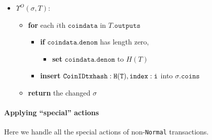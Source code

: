 \documentclass[
]{article}
\newcommand{\passthrough}[1]{#1}
\providecommand{\tightlist}{%
  \setlength{\itemsep}{0pt}\setlength{\parskip}{0pt}}
\begin{document}
\begin{itemize}
  \tightlist
  \item
        \(\Upsilon^O(\sigma, T)\):

        \begin{itemize}
          \tightlist
          \item
                \textbf{for} each \(i\)th \(\mathtt{coindata}\) in
                \(T.\mathtt{outputs}\)

                \begin{itemize}
                  \tightlist
                  \item
                        \textbf{if} \(\mathtt{coindata.denom}\) has length zero,

                        \begin{itemize}
                          \tightlist
                          \item
                                \textbf{set} \(\mathtt{coindata.denom}\) to \(H(T)\)
                        \end{itemize}
                  \item
                        \textbf{insert} \(\mathtt{CoinID\\{txhash: H(T), index: i \\}}\)
                        into \(\sigma.\mathtt{coins}\)
                \end{itemize}
          \item
                \textbf{return} the changed \(\sigma\)
        \end{itemize}
\end{itemize}

\hypertarget{applying-special-actions}{%
  \paragraph{Applying ``special''
    actions}\label{applying-special-actions}}

Here we handle all the special actions of
non-\passthrough{\lstinline!Normal!} transactions.
\end{document}

